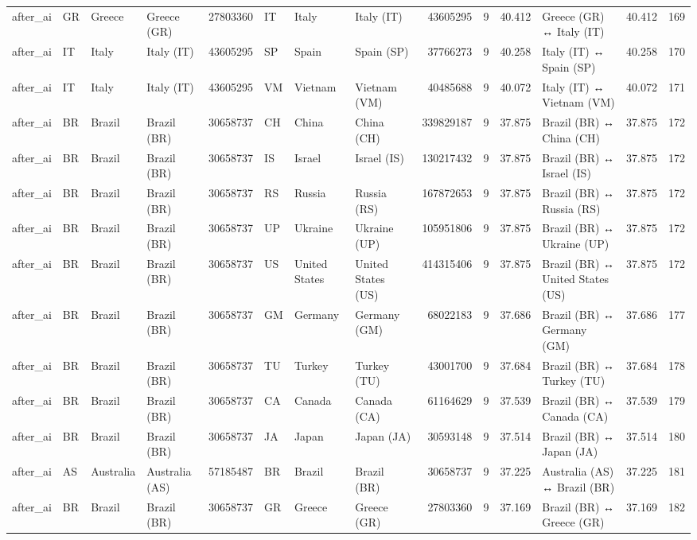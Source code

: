 \begin{tabular}{llllrlllrrrlrr}
after\_ai & GR & Greece & Greece (GR) & 27803360 & IT & Italy & Italy (IT) & 43605295 & 9 & 40.412 & Greece (GR) ↔ Italy (IT) & 40.412 & 169 \\
after\_ai & IT & Italy & Italy (IT) & 43605295 & SP & Spain & Spain (SP) & 37766273 & 9 & 40.258 & Italy (IT) ↔ Spain (SP) & 40.258 & 170 \\
after\_ai & IT & Italy & Italy (IT) & 43605295 & VM & Vietnam & Vietnam (VM) & 40485688 & 9 & 40.072 & Italy (IT) ↔ Vietnam (VM) & 40.072 & 171 \\
after\_ai & BR & Brazil & Brazil (BR) & 30658737 & CH & China & China (CH) & 339829187 & 9 & 37.875 & Brazil (BR) ↔ China (CH) & 37.875 & 172 \\
after\_ai & BR & Brazil & Brazil (BR) & 30658737 & IS & Israel & Israel (IS) & 130217432 & 9 & 37.875 & Brazil (BR) ↔ Israel (IS) & 37.875 & 172 \\
after\_ai & BR & Brazil & Brazil (BR) & 30658737 & RS & Russia & Russia (RS) & 167872653 & 9 & 37.875 & Brazil (BR) ↔ Russia (RS) & 37.875 & 172 \\
after\_ai & BR & Brazil & Brazil (BR) & 30658737 & UP & Ukraine & Ukraine (UP) & 105951806 & 9 & 37.875 & Brazil (BR) ↔ Ukraine (UP) & 37.875 & 172 \\
after\_ai & BR & Brazil & Brazil (BR) & 30658737 & US & United States & United States (US) & 414315406 & 9 & 37.875 & Brazil (BR) ↔ United States (US) & 37.875 & 172 \\
after\_ai & BR & Brazil & Brazil (BR) & 30658737 & GM & Germany & Germany (GM) & 68022183 & 9 & 37.686 & Brazil (BR) ↔ Germany (GM) & 37.686 & 177 \\
after\_ai & BR & Brazil & Brazil (BR) & 30658737 & TU & Turkey & Turkey (TU) & 43001700 & 9 & 37.684 & Brazil (BR) ↔ Turkey (TU) & 37.684 & 178 \\
after\_ai & BR & Brazil & Brazil (BR) & 30658737 & CA & Canada & Canada (CA) & 61164629 & 9 & 37.539 & Brazil (BR) ↔ Canada (CA) & 37.539 & 179 \\
after\_ai & BR & Brazil & Brazil (BR) & 30658737 & JA & Japan & Japan (JA) & 30593148 & 9 & 37.514 & Brazil (BR) ↔ Japan (JA) & 37.514 & 180 \\
after\_ai & AS & Australia & Australia (AS) & 57185487 & BR & Brazil & Brazil (BR) & 30658737 & 9 & 37.225 & Australia (AS) ↔ Brazil (BR) & 37.225 & 181 \\
after\_ai & BR & Brazil & Brazil (BR) & 30658737 & GR & Greece & Greece (GR) & 27803360 & 9 & 37.169 & Brazil (BR) ↔ Greece (GR) & 37.169 & 182 \\

\end{tabular}
